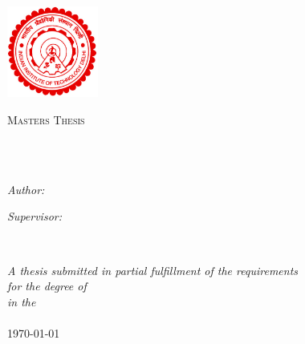 \documentclass[
12pt, %
oneside, %
english, 
onehalfspacing, %
headsepline, %
]{MastersDoctoralThesis} %
\author{Shadab Zafar}
\begin{document}
\frontmatter

\pagestyle{plain}


\begin{titlepage}
\begin{center}
\includegraphics[width=30mm,height=30mm]{iitd-logo-large}
\\
\vspace*{.06\textheight}
{\scshape\LARGE \univname\par}\vspace{1.5cm}
\textsc{\Large Masters Thesis}\\[0.5cm]

\HRule \\[0.4cm]
{\huge \bfseries \ttitle\par}\vspace{0.4cm}
\HRule \\[1.5cm]

\begin{minipage}[t]{0.4\textwidth}
\begin{flushleft} \large
\emph{Author:}\\
\authorname
\end{flushleft}
\end{minipage}
\begin{minipage}[t]{0.4\textwidth}
\begin{flushright} \large
\emph{Supervisor:} \\
\supname
\end{flushright}
\end{minipage}\\[3cm]

\vfill

\large \textit{
	A thesis submitted in partial fulfillment of the requirements\\
	for the degree of \degreename
}\\[0.3cm]
	\textit{in the}\\[0.4cm]
	\deptname\\[1cm]

	{\large \monthyeardate\today}

\end{center}
\end{titlepage}
\end{document}
